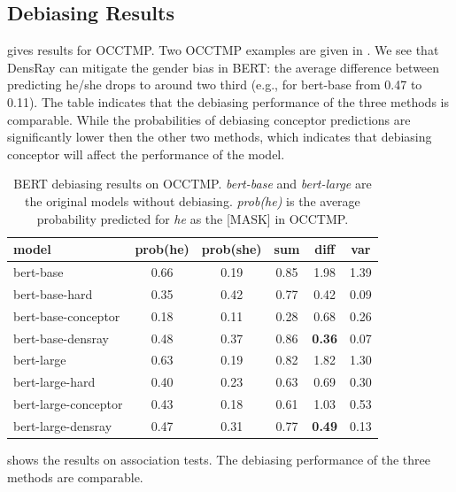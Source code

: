 
\subsection{Debiasing Results}
 gives results for OCCTMP. Two OCCTMP
examples are given in . We see that
DensRay can mitigate the gender bias in BERT: the average
difference between predicting he/she drops to around two
third (e.g., for bert-base from 0.47 to 0.11). The table indicates that the debiasing performance of the three methods is comparable. While the probabilities of debiasing conceptor predictions are significantly lower then the other two methods, which indicates that debiasing conceptor will affect the performance of the model.

\begin{table}[ht]
\centering
\footnotesize
\begin{tabular}{lccccc}
\hline
model & prob(he) & prob(she) & sum &diff & var\\
\hline
bert-base & 0.66 & 0.19 & 0.85 &1.98&1.39\\
bert-base-hard & 0.35 & 0.42 & 0.77&0.42&0.09\\
bert-base-conceptor & 0.18 & 0.11 & 0.28 & 0.68&0.26\\
bert-base-densray & 0.48 & 0.37 & 0.86&\textbf{0.36}&0.07\\
\hline
bert-large  & 0.63 & 0.19 & 0.82  &1.82&1.30\\
bert-large-hard & 0.40 & 0.23 & 0.63&0.69&0.30\\
bert-large-conceptor & 0.43 & 0.18 & 0.61 & 1.03&0.53\\
bert-large-densray  & 0.47 & 0.31 & 0.77&\textbf{0.49}&0.13 \\
\hline
\end{tabular}
\caption{ BERT debiasing results on
  OCCTMP. \textit{bert-base} and \textit{bert-large} are the
  original models without debiasing. \textit{prob(he)} is
  the average probability  predicted for \textit{he} as
  the [MASK] in OCCTMP.}
\end{table}

 shows the results on association tests. The debiasing performance of the three methods are comparable.

